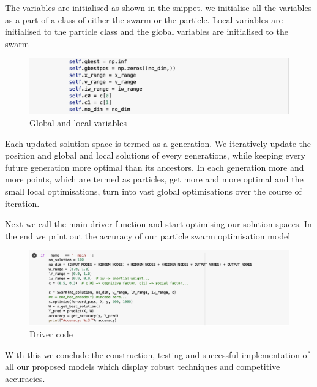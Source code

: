 \documentclass[12pt]{article}
\newcommand{\nd}{\noindent}
\begin{document}
\newpage
\vspace{10mm}
\nd The variables are initialised as shown in the snippet. we initialise all the variables as a part of a class of either the swarm or the particle. Local variables are initialised to the particle class and the global variables are initialised to the swarm 

\begin{center}
\begin{figure}[h]
\centerline{\includegraphics[scale=.6]{vari.png}}
\caption{Global and local variables}
\end{figure}
\end{center}

\nd Each updated solution space is termed as a generation. We iteratively update the position and global and local solutions of every generations, while keeping every future generation more optimal than its ancestors. In each generation more and more points, which are termed as particles, get more and more optimal and the small local optimisations, turn into vast global optimisations over the course of iteration. 

\newpage
\nd Next we call the main driver function and start optimising our solution spaces. In the end we print out the accuracy of our particle swarm optimisation model

 \begin{center}
\begin{figure}[h]
\centerline{\includegraphics[scale=.4]{driver.png}}
\caption{Driver code}
\end{figure}
\end{center}

\nd With this we conclude the construction, testing and successful implementation of all our proposed models which display robust techniques and competitive accuracies. 
\end{document}
